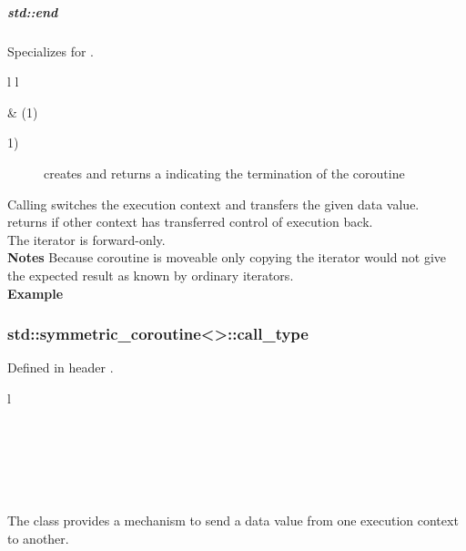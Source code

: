 \subparagraph*{std::end}
Specializes  for \pushcoro.\\

\begin{tabular}{ l l }
    \midrule

     & (1)\\

    \midrule
\end{tabular}

\begin{description}
    \item[1)] creates and returns a  indicating the termination of the coroutine\\
\end{description}

Calling  switches the execution context and transfers the given data value.\\
 returns if other context has transferred control of execution back.\\
The iterator is forward-only.\\

{\bf Notes}
\newline
Because coroutine is moveable only copying the iterator would not give the expected
result as known by ordinary iterators.\\

{\bf Example}


\subsubsection*{std::symmetric\_coroutine<>::call\_type}
Defined in header .\\
\begin{tabular}{ l }
    \midrule

    \\

    \midrule

    \\

    \midrule

    \\

    \midrule
\end{tabular}
\newline
The class \callcoro provides a mechanism to send a data value from one
execution context to another.\\

